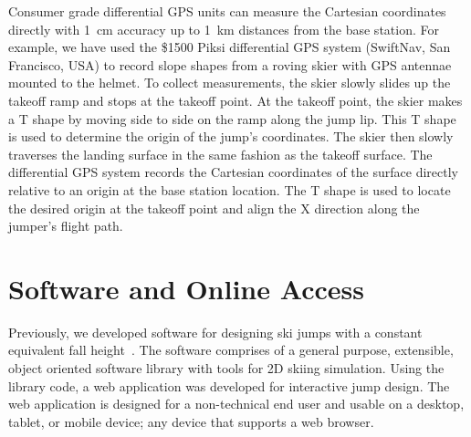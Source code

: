 \documentclass{article}
\begin{document}
Consumer grade differential GPS units can measure the Cartesian coordinates
directly with 1~\si{\centi\meter} accuracy up to 1~\si{\kilo\meter} distances
from the base station. For example, we have used the \$1500 Piksi differential
GPS system (SwiftNav, San Francisco, USA) to record slope shapes from a roving
skier with GPS antennae mounted to the helmet. To collect measurements, the
skier slowly slides up the takeoff ramp and stops at the takeoff point. At the
takeoff point, the skier makes a T shape by moving side to side on the ramp
along the jump lip. This T shape is used to determine the origin of the jump's
coordinates. The skier then slowly traverses the landing surface in the same
fashion as the takeoff surface. The differential GPS system records the
Cartesian coordinates of the surface directly relative to an origin at the base
station location. The T shape is used to locate the desired origin at the
takeoff point and align the X direction along the jumper's flight path.

\section{Software and Online Access}
%
Previously, we developed software for designing ski jumps with a constant
equivalent fall height~\cite{Moore2018}. The software comprises of a general
purpose, extensible, object oriented software library with tools for 2D skiing
simulation. Using the library code, a web application was developed for
interactive jump design. The web application is designed for a non-technical
end user and usable on a desktop, tablet, or mobile device; any device that
supports a web browser.
\end{document}
